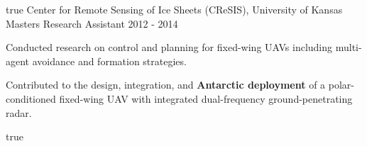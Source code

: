 \begin{cventries}
    {} %
    {true}
    {}
%   
\cvexpentry
  	{Center for Remote Sensing of Ice Sheets (CReSIS), University of Kansas} %
  	{Masters Research Assistant} %
    {} %
    {2012 - 2014} %
    {
      \begin{cvitems} %
      	\item Conducted research on control and planning for fixed-wing UAVs including multi-agent avoidance and formation strategies.
      	\item Contributed to the design, integration, and \textbf{Antarctic deployment} of a polar-conditioned fixed-wing UAV with integrated dual-frequency ground-penetrating radar.
      \end{cvitems}
    } %
    {} %
    {true}
    {}
\end{cventries}
